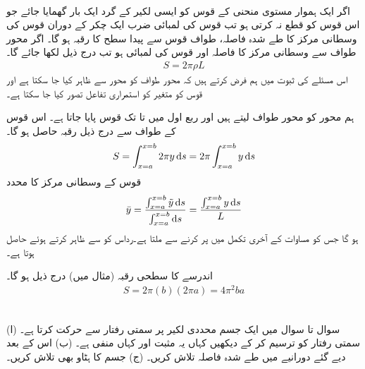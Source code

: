 \\
اگر ایک ہموار مستوی منحنی کے قوس کو ایسی لکیر کے گرد ایک بار گھمایا جائے جو اس قوس کو قطع نہ کرتی ہو تب قوس کی لمبائی ضرب ایک چکر کے دوران قوس کی وسطانی مرکز کا طے شدہ فاصلہ،  طواف قوس سے پیدا سطح کا رقبہ ہو گا۔ اگر محور طواف سے وسطانی مرکز کا فاصلہ  اور قوس کی لمبائی  ہو تب درج ذیل لکھا جائے گا۔
\begin{align}
S=2\pi \rho L
\end{align} 
اس مسئلے کی ثبوت میں ہم فرض کرتے ہیں کہ محور طواف کو محور  سے ظاہر کیا جا سکتا ہے اور قوس کو متغیر  کو استمراری تفاعل تصور کیا جا سکتا ہے۔

ہم محور  کو محور طواف لیتے ہیں اور ربع اول میں  تا  تک قوس پایا جاتا ہے۔ اس قوس کے طواف سے درج ذیل رقبہ حاصل ہو گا۔
\begin{align}\label{مساوات_تکمل_استعمال_مسئلہ_پاپس_رقبہ}
S=\int_{x=a}^{x=b} 2\pi y\dif s=2\pi\int_{x=a}^{x=b}y\dif s
\end{align}
قوس کے وسطانی مرکز کا  محدد 
\begin{align*}
\bar{y}=\frac{\int_{x=a}^{x=b}\tilde{y}\dif s}{\int_{x=a}^{x=b}\dif s}=\frac{\int_{x=a}^{x=b}y\dif s}{L}
\end{align*}
ہو گا جس کو مساوات   کے آخری تکمل میں پر کرنے سے  ملتا ہے۔رداس  کو  سے ظاہر کرتے ہوئے   حاصل ہوتا ہے۔

اندرسے کا سطحی رقبہ (مثال  میں) درج ذیل ہو گا۔
\begin{align*}
S=2\pi(b)(2\pi a)=4\pi^2ba
\end{align*}

\\
سوال  تا سوال  میں ایک جسم محددی لکیر پر سمتی رفتار  سے حرکت کرتا ہے۔ (ا) سمتی رفتار کو ترسیم کر کے دیکھیں کہاں یہ مثبت اور کہاں منفی ہے۔ (ب) اس کے بعد دیے گئے دورانیے میں طے شدہ فاصلہ تلاش کریں۔ (ج) جسم کا ہٹاو بھی تلاش کریں۔

